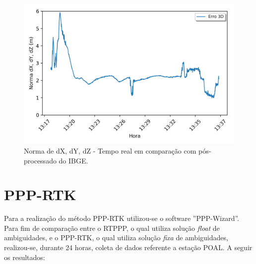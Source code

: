 \begin{figure}[H]
\centering
\includegraphics[scale=0.9]{data/Graphics/RJ_T20721/RJ_T20721_comparison_graphic_result.png}
\caption{Norma de dX, dY, dZ - Tempo real em comparação com pós-processado do IBGE.}
\label{comp_norma_20721}
\end{figure}



\section{PPP-RTK}
Para a realização do método PPP-RTK utilizou-se o software ''PPP-Wizard''. Para fim de comparação entre o RTPPP, o qual utiliza solução \textit{float} de ambiguidades, e o PPP-RTK, o qual utiliza solução \textit{fixa} de ambiguidades, realizou-se, durante 24 horas, coleta de dados referente a estação POAL. A seguir os resultados:



